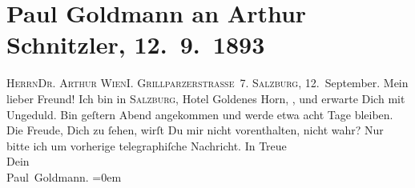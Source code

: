 

         \renewcommand{\erwaehnteOrte}{Orte: Getreidegasse, Grillparzerstraße, Hotel Goldenes Horn, Salzburg, Wien}
         \renewcommand{\erwaehnteWerke}{}
               \section[Paul Goldmann an Arthur Schnitzler, 12. 9. 1893]{ Paul Goldmann an Arthur Schnitzler, 12. 9. 1893}\nopagebreak{}\rehead{ }\begin{ledgroupsized}[t]{13cm}\normalsize\beginnumbering \toendnotes[C]{\smallbreak\pagebreak[2]} 
\toendnotes[C]{\smallbreak}\pstart{}{\pb}\textsc{Herrn}\pend{}\pstart{}\textsc{Dr. Arthur \label{T_L02715-1v}\label{T_L02715-1h}}\pend{}\pstart{}\textsc{Wien}\pend{}\pstart{}\textsc{I. Grillparzerstraſse 7}.\pend{}{\bigskip}\pstart
           \noindent{}\raggedleft{}{\pb}\textsc{Salzburg}, 12. September.
               \pend
           \pstart\center{}Mein lieber Freund!\pend\pstart
           Ich bin in \textsc{Salzburg}, Hotel Goldenes Horn, \label{K_L02715-2v}\label{K_L02715-2h}, und erwarte Dich mit Ungeduld. Bin geſtern{ }Abend angekommen und werde etwa acht Tage bleiben. Die Freude, Dich zu
               ſehen, wirſt Du mir nicht vorenthalten, nicht wahr? Nur bitte ich um vorherige
               telegraphiſche Nachricht.\pend
           \pstart
           In Treue{\\[\baselineskip]}Dein {\\[\baselineskip]}\spacefill\mbox{Paul Goldmann.}\pend
           \leftskip=0em{}
         
         \endnumbering{}\end{ledgroupsized}  \newcommand{\dateiname}{L02715}\newcommand{\titel}{Paul Goldmann an Arthur Schnitzler, 12. 9. 1893}\newcommand{\editorInnen}{Martin Anton Müller und Laura Untner}
      